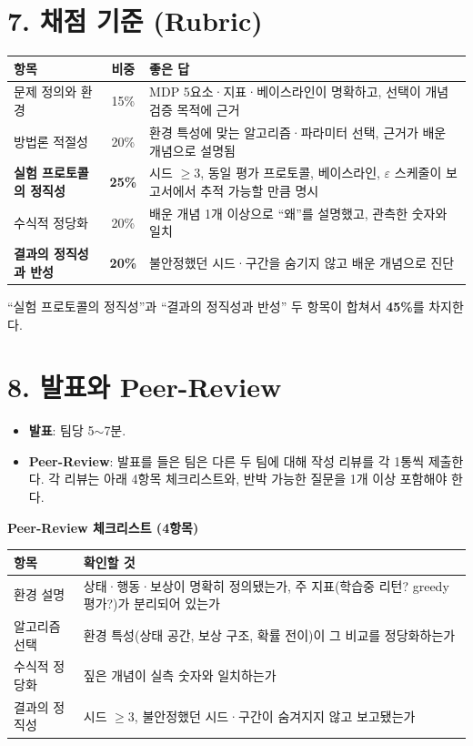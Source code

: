 \documentclass[12pt]{article}
\begin{document}
\newpage
\section*{7. 채점 기준 (Rubric)}
\begin{center}
\small
\begin{tabular}{@{}lcp{6.8cm}@{}}
\toprule
항목 & 비중 & 좋은 답 \\
\midrule
문제 정의와 환경 & 15\% & MDP 5요소·지표·베이스라인이 명확하고,
선택이 개념 검증 목적에 근거 \\
방법론 적절성 & 20\% & 환경 특성에 맞는 알고리즘·파라미터 선택,
근거가 배운 개념으로 설명됨 \\
\textbf{실험 프로토콜의 정직성} & \textbf{25\%} & 시드 $\ge 3$,
동일 평가 프로토콜, 베이스라인, $\varepsilon$ 스케줄이 보고서에서
추적 가능할 만큼 명시 \\
수식적 정당화 & 20\% & 배운 개념 1개 이상으로 ``왜''를 설명했고,
관측한 숫자와 일치 \\
\textbf{결과의 정직성과 반성} & \textbf{20\%} & 불안정했던
시드·구간을 숨기지 않고 배운 개념으로 진단 \\
\bottomrule
\end{tabular}
\end{center}
\vspace{4pt}
``실험 프로토콜의 정직성''과 ``결과의 정직성과 반성'' 두 항목이
합쳐서 \textbf{45\%}를 차지한다.

\section*{8. 발표와 Peer-Review}
\begin{itemize}
\item \textbf{발표}: 팀당 5$\sim$7분.
\item \textbf{Peer-Review}: 발표를 들은 팀은 다른 두 팀에 대해
  작성 리뷰를 각 1통씩 제출한다. 각 리뷰는 아래 4항목
  체크리스트와, 반박 가능한 질문을 1개 이상 포함해야 한다.
\end{itemize}

\vspace{4pt}
\noindent\textbf{Peer-Review 체크리스트 (4항목)}
\begin{center}
\small
\begin{tabular}{@{}lp{9cm}@{}}
\toprule
항목 & 확인할 것 \\
\midrule
환경 설명 & 상태·행동·보상이 명확히 정의됐는가, 주 지표(학습중
리턴? greedy 평가?)가 분리되어 있는가 \\
알고리즘 선택 & 환경 특성(상태 공간, 보상 구조, 확률 전이)이 그
비교를 정당화하는가 \\
수식적 정당화 & 짚은 개념이 실측 숫자와 일치하는가 \\
결과의 정직성 & 시드 $\ge 3$, 불안정했던 시드·구간이 숨겨지지
않고 보고됐는가 \\
\bottomrule
\end{tabular}
\end{center}
\end{document}

